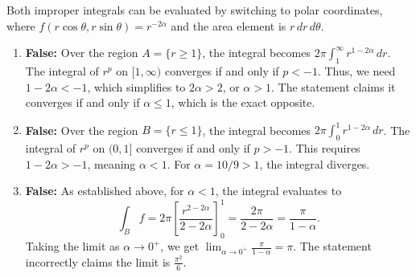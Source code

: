 \begin{exercisesolution}
\label{sol:improper_integrals_inverse_power_tf}
Both improper integrals can be evaluated by switching to polar coordinates, where $f(r\cos\theta, r\sin\theta) = r^{-2\alpha}$ and the area element is $r\,dr\,d\theta$.
\begin{enumerate}[label=\textbf{(\alph*)}]
  \item \textbf{False:} Over the region $A = \{r \ge 1\}$, the integral becomes $2\pi \int_1^\infty r^{1-2\alpha} \, dr$. The integral of $r^p$ on $[1,\infty)$ converges if and only if $p < -1$. Thus, we need $1-2\alpha < -1$, which simplifies to $2\alpha > 2$, or $\alpha > 1$. The statement claims it converges if and only if $\alpha \le 1$, which is the exact opposite.
  \item \textbf{False:} Over the region $B = \{r \le 1\}$, the integral becomes $2\pi \int_0^1 r^{1-2\alpha} \, dr$. The integral of $r^p$ on $(0,1]$ converges if and only if $p > -1$. This requires $1-2\alpha > -1$, meaning $\alpha < 1$. For $\alpha = 10/9 > 1$, the integral diverges.
  \item \textbf{False:} As established above, for $\alpha < 1$, the integral evaluates to
  \[ \int_B f = 2\pi \left[ \frac{r^{2-2\alpha}}{2-2\alpha} \right]_0^1 = \frac{2\pi}{2-2\alpha} = \frac{\pi}{1-\alpha}. \]
  Taking the limit as $\alpha \to 0^+$, we get $\lim_{\alpha \to 0^+} \frac{\pi}{1-\alpha} = \pi$. The statement incorrectly claims the limit is $\frac{\pi^2}{6}$.
\end{enumerate}
\end{exercisesolution}

